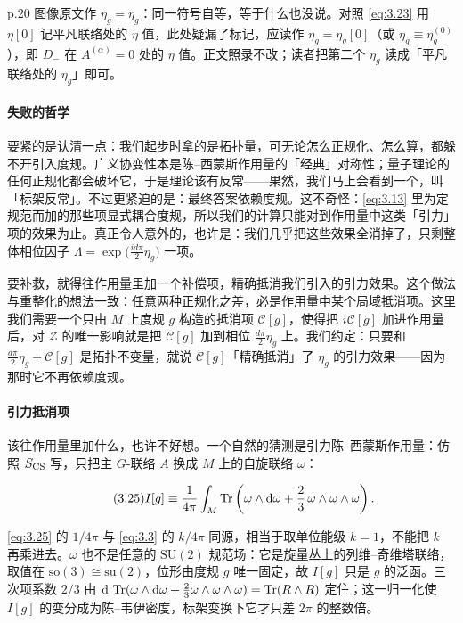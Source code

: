 \begin{yizhu}[原文疑误]
p.20 图像原文作 $\eta_g=\eta_g$：同一符号自等，等于什么也没说。对照 \eqref{eq:3.23} 用 $\eta[0]$ 记平凡联络处的 $\eta$ 值，此处疑漏了标记，应读作 $\eta_g=\eta_g[0]$（或 $\eta_g\equiv\eta_g^{(0)}$），即 $D_-$ 在 $A^{(\alpha)}=0$ 处的 $\eta$ 值。正文照录不改；读者把第二个 $\eta_g$ 读成「平凡联络处的 $\eta_g$」即可。
\end{yizhu}

\paragraph{失败的哲学} 要紧的是认清一点：我们起步时拿的是拓扑量，可无论怎么正规化、怎么算，都躲不开引入度规。广义协变性本是陈--西蒙斯作用量的「经典」对称性；量子理论的任何正规化都会破坏它，于是理论该有反常——果然，我们马上会看到一个，叫「标架反常」。不过更紧迫的是：最终答案依赖度规。这不奇怪：\eqref{eq:3.13} 里为定规范而加的那些项显式耦合度规，所以我们的计算只能对到作用量中这类「引力」项的效果为止。真正令人意外的，也许是：我们几乎把这些效果全消掉了，只剩整体相位因子 $\Lambda=\exp\bigl(\tfrac{id\pi}{2}\eta_g\bigr)$ 一项。

要补救，就得往作用量里加一个补偿项，精确抵消我们引入的引力效果。这个做法与重整化的想法一致：任意两种正规化之差，必是作用量中某个局域抵消项。这里我们需要一个只由 $M$ 上度规 $g$ 构造的抵消项 $\mathcal{C}[g]$，使得把 $i\mathcal{C}[g]$ 加进作用量后，对 $\mathcal{Z}$ 的唯一影响就是把 $\mathcal{C}[g]$ 加到相位 $\frac{d\pi}{2}\eta_g$ 上。我们约定：只要和 $\frac{d\pi}{2}\eta_g+\mathcal{C}[g]$ 是拓扑不变量，就说 $\mathcal{C}[g]$「精确抵消」了 $\eta_g$ 的引力效果——因为那时它不再依赖度规。

\paragraph{引力抵消项} 该往作用量里加什么，也许不好想。一个自然的猜测是引力陈--西蒙斯作用量：仿照 $S_{\mathrm{CS}}$ 写，只把主 $G$-联络 $A$ 换成 $M$ 上的自旋联络 $\omega$：

\begin{equation}\tag{3.25}\label{eq:3.25}
  I[g] \equiv \frac{1}{4\pi}\int_M \operatorname{Tr}\left(\omega\wedge\mathrm{d}\omega + \frac{2}{3}\,\omega\wedge\omega\wedge\omega\right).
\end{equation}

\begin{yizhu}[易错点]
\eqref{eq:3.25} 的 $1/4\pi$ 与 \eqref{eq:3.3} 的 $k/4\pi$ 同源，相当于取单位能级 $k=1$，不能把 $k$ 再乘进去。$\omega$ 也不是任意的 $\mathrm{SU}(2)$ 规范场：它是旋量丛上的列维–奇维塔联络，取值在 $\mathrm{so}(3)\cong\mathrm{su}(2)$，位形由度规 $g$ 唯一固定，故 $I[g]$ 只是 $g$ 的泛函。三次项系数 $2/3$ 由 $\mathrm{d}\,\operatorname{Tr}(\omega\wedge\mathrm{d}\omega+\frac{2}{3}\omega\wedge\omega\wedge\omega)=\operatorname{Tr}(R\wedge R)$ 定住；这一归一化使 $I[g]$ 的变分成为陈--韦伊密度，标架变换下它才只差 $2\pi$ 的整数倍。
\end{yizhu}

